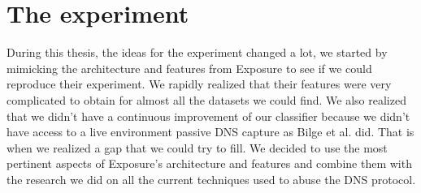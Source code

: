
\chapter{The experiment} %
\label{experiment}
During this thesis, the ideas for the experiment changed a lot, we started by mimicking the architecture and features from Exposure to see if we could reproduce their experiment. We rapidly realized that their features were very complicated to obtain for almost all the datasets we could find. We also realized that we didn't have a continuous improvement of our classifier because we didn't have access to a live environment passive DNS capture as Bilge et al. did. That is when we realized a gap that we could try to fill. We decided to use the most pertinent aspects of Exposure's architecture and features and combine them with the research we did on all the current techniques used to abuse the DNS protocol.
